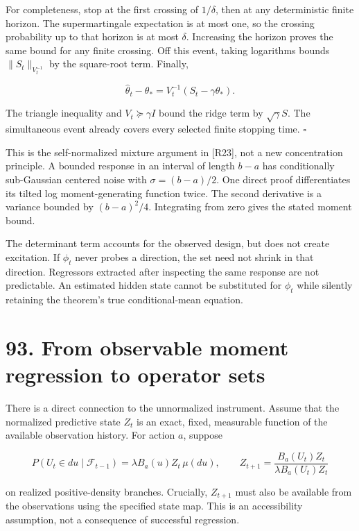 \documentclass[11pt,letterpaper]{article}
\begin{document}
For completeness, stop at the first crossing of \(1/\delta\), then at
any deterministic finite horizon. The supermartingale expectation is at
most one, so the crossing probability up to that horizon is at most
\(\delta\). Increasing the horizon proves the same bound for any finite
crossing. Off this event, taking logarithms bounds
\(\|S_t\|_{V_t^{-1}}\) by the square-root term. Finally,

\[
\widehat\theta_t-\theta_*
=V_t^{-1}(S_t-\gamma\theta_*).
\]

The triangle inequality and \(V_t\succeq\gamma I\) bound the ridge term
by \(\sqrt\gamma S\). The simultaneous event already covers every
selected finite stopping time. \(\square\)

This is the self-normalized mixture argument in {[}R23{]}, not a new
concentration principle. A bounded response in an interval of length
\(b-a\) has conditionally sub-Gaussian centered noise with
\(\sigma=(b-a)/2\). One direct proof differentiates its tilted log
moment-generating function twice. The second derivative is a variance
bounded by \((b-a)^2/4\). Integrating from zero gives the stated moment
bound.

The determinant term accounts for the observed design, but does not
create excitation. If \(\phi_t\) never probes a direction, the set need
not shrink in that direction. Regressors extracted after inspecting the
same response are not predictable. An estimated hidden state cannot be
substituted for \(\phi_t\) while silently retaining the theorem's true
conditional-mean equation.

\section{93. From observable moment regression to operator
sets}\label{from-observable-moment-regression-to-operator-sets}

There is a direct connection to the unnormalized instrument. Assume that
the normalized predictive state \(Z_t\) is an exact, fixed, measurable
function of the available observation history. For action \(a\), suppose

\[
P(U_t\in du\mid\mathcal F_{t-1})
=\lambda B_a(u)Z_t\,\mu(du),
\qquad
Z_{t+1}=\frac{B_a(U_t)Z_t}{\lambda B_a(U_t)Z_t}
\]

on realized positive-density branches. Crucially, \(Z_{t+1}\) must also
be available from the observations using the specified state map. This
is an accessibility assumption, not a consequence of successful
regression.
\end{document}
